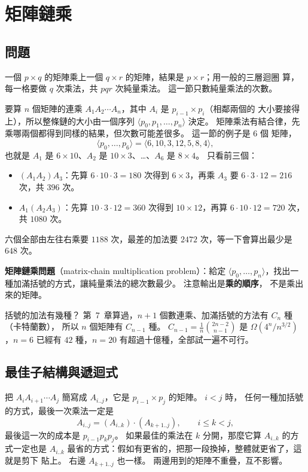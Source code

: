 \section{矩陣鏈乘}
\label{sec:dp-matrix}

\subsection{問題}

一個 $p \times q$ 的矩陣乘上一個 $q \times r$ 的矩陣，結果是 $p \times r$；用一般的三層迴圈
算，每一格要做 $q$ 次乘法，共 $pqr$ 次純量乘法。 這一節只數純量乘法的次數。

要算 $n$ 個矩陣的連乘 $A_1 A_2 \cdots A_n$，其中 $A_i$ 是 $p_{i-1} \times p_i$（相鄰兩個的
大小要接得上），所以整條鏈的大小由一個序列 $\langle p_0, p_1, \ldots, p_n \rangle$ 決定。
矩陣乘法有結合律，先乘哪兩個都得到同樣的結果，但次數可能差很多。 這一節的例子是 $6$ 個
矩陣，
\[
\langle p_0, \ldots, p_6 \rangle = \langle 6, 10, 3, 12, 5, 8, 4 \rangle ,
\]
也就是 $A_1$ 是 $6 \times 10$、$A_2$ 是 $10 \times 3$、…、$A_6$ 是 $8 \times 4$。 只看前三個：
\begin{itemize}
\item $(A_1 A_2) A_3$：先算 $6 \cdot 10 \cdot 3 = 180$ 次得到 $6 \times 3$，再乘 $A_3$ 要
$6 \cdot 3 \cdot 12 = 216$ 次，共 $396$ 次。
\item $A_1 (A_2 A_3)$：先算 $10 \cdot 3 \cdot 12 = 360$ 次得到 $10 \times 12$，再算
$6 \cdot 10 \cdot 12 = 720$ 次，共 $1080$ 次。
\end{itemize}
六個全部由左往右乘要 $1188$ 次，最差的加法要 $2472$ 次，等一下會算出最少是 $648$ 次。

\textbf{矩陣鏈乘問題}（matrix-chain multiplication problem）：給定 $\langle p_0, \ldots, p_n
\rangle$，找出一種加滿括號的方式，讓純量乘法的總次數最少。 注意輸出是\textbf{乘的順序}，
不是乘出來的矩陣。

括號的加法有幾種？ 第~7~章算過，$n + 1$ 個數連乘、加滿括號的方法有 $C_n$ 種（卡特蘭數），
所以 $n$ 個矩陣有 $C_{n-1}$ 種。 $C_{n-1} = \frac{1}{n}\binom{2n-2}{n-1}$ 是
$\Omega(4^n / n^{3/2})$，$n = 6$ 已經有 $42$ 種，$n = 20$ 有超過十億種，全部試一遍不可行。

\subsection{最佳子結構與遞迴式}

把 $A_i A_{i+1} \cdots A_j$ 簡寫成 $A_{i..j}$，它是 $p_{i-1} \times p_j$ 的矩陣。 $i < j$ 時，
任何一種加括號的方式，最後一次乘法一定是
\[
A_{i..j} = (A_{i..k}) \cdot (A_{k+1..j}), \qquad i \le k < j ,
\]
最後這一次的成本是 $p_{i-1} p_k p_j$。 如果最佳的乘法在 $k$ 分開，那麼它算 $A_{i..k}$ 的方
式一定也是 $A_{i..k}$ 最省的方式：假如有更省的，把那一段換掉，整體就更省了，這就是剪下
貼上。 右邊 $A_{k+1..j}$ 也一樣。 兩邊用到的矩陣不重疊，互不影響。

